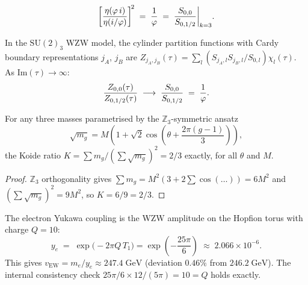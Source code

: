 \begin{proposition}
    \label{P1:prop:eta}
    \begin{equation}
      \left[\frac{\eta(\varphi\,i)}{\eta(i/\varphi)}\right]^{\!2}
      \;=\; \frac{1}{\varphi}
      \;=\; \frac{S_{0,0}}{S_{0,1/2}}\bigg|_{k=3}.
      \label{P1:eq:eta_identity}
    \end{equation}
    \end{proposition}

\begin{proposition}
    \label{P1:prop:cardy}
    In the $\mathrm{SU}(2)_3$ WZW model, the cylinder partition
    functions with Cardy boundary representations $j_A$, $j_B$ are
    $Z_{j_A,j_B}(\tau)=\sum_l(S_{j_A,l}S_{j_B,l}/S_{0,l})\chi_l(\tau)$.
    As $\mathrm{Im}(\tau)\to\infty$:
    \begin{equation}
      \frac{Z_{0,0}(\tau)}{Z_{0,1/2}(\tau)}
      \;\longrightarrow\;
      \frac{S_{0,0}}{S_{0,1/2}}
      \;=\; \frac{1}{\varphi}.
      \label{P1:eq:cardy_ratio}
    \end{equation}
    \end{proposition}

\begin{theorem}[Koide $K=2/3$ automatic]
\label{P1:thm:koide}
For any three masses parametrised by the $\mathbb{Z}_3$-symmetric ansatz
\begin{equation}
  \sqrt{m_g} = M\!\left(1 + \sqrt{2}\cos\!\left(\theta+\frac{2\pi(g-1)}{3}\right)\right),
  \label{P1:eq:koide_ansatz}
\end{equation}
the Koide ratio $K = \sum m_g/(\sum\sqrt{m_g})^2 = 2/3$ exactly,
for all $\theta$ and $M$.
\end{theorem}
\begin{proof}
$\mathbb{Z}_3$ orthogonality gives $\sum m_g = M^2(3 + 2\sum\cos(\ldots)) = 6M^2$
and $(\sum\sqrt{m_g})^2 = 9M^2$, so $K=6/9=2/3$.
\end{proof}

\begin{result}
\label{P1:res:yukawa}
The electron Yukawa coupling is the WZW amplitude on the Hopfion torus
with charge $Q=10$:
\begin{equation}
  \boxed{y_e \;=\; \exp\!\bigl(-2\pi Q\,T_1\bigr)
  = \exp\!\left(-\frac{25\pi}{6}\right) \;\approx\; 2.066\times10^{-6}.}
  \label{P1:eq:yukawa}
\end{equation}
This gives $v_{\mathrm{EW}} = m_e/y_e \approx 247.4\;\text{GeV}$
(deviation $0.46\%$ from $246.2\;\text{GeV}$).
The internal consistency check $25\pi/6\times 12/(5\pi) = 10 = Q$ holds exactly.
\end{result}

